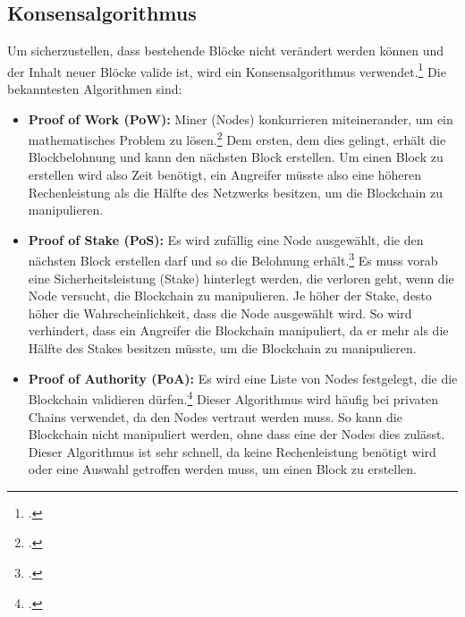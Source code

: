 \subsection{Konsensalgorithmus}
\label{sec:definition-konsensalgorithmus}
Um sicherzustellen, dass bestehende Blöcke nicht verändert werden können und der Inhalt neuer Blöcke valide ist, wird ein Konsensalgorithmus verwendet.\footcite[Vgl.][S. 2 f\adddot]{q4}
Die bekanntesten Algorithmen sind:
\begin{itemize}
    \item \textbf{Proof of Work (PoW):}
    Miner (Nodes) konkurrieren miteinerander, um ein mathematisches Problem zu lösen.\footcite[Vgl. hierzu und im Folgenden][3]{q4}
    Dem ersten, dem dies gelingt, erhält die Blockbelohnung und kann den nächsten Block erstellen.
    Um einen Block zu erstellen wird also Zeit benötigt, ein Angreifer müsste also eine höheren Rechenleistung als die Hälfte des Netzwerks besitzen, um die Blockchain zu manipulieren.

    \item \textbf{Proof of Stake (PoS):}
    Es wird zufällig eine Node ausgewählt, die den nächsten Block erstellen darf und so die Belohnung erhält.\footcite[Vgl. hierzu und im Folgenden][2]{q7}
    Es muss vorab eine Sicherheitsleistung (Stake) hinterlegt werden, die verloren geht, wenn die Node versucht, die Blockchain zu manipulieren. 
    Je höher der Stake, desto höher die Wahrscheinlichkeit, dass die Node ausgewählt wird.
    So wird verhindert, dass ein Angreifer die Blockchain manipuliert, da er mehr als die Hälfte des Stakes besitzen müsste, um die Blockchain zu manipulieren.

    \item \textbf{Proof of Authority (PoA):}
    Es wird eine Liste von Nodes festgelegt, die die Blockchain validieren dürfen.\footcite[Vgl. hierzu und im Folgenden][]{w14}
    Dieser Algorithmus wird häufig bei privaten Chains verwendet, da den Nodes vertraut werden muss.
    So kann die Blockchain nicht manipuliert werden, ohne dass eine der Nodes dies zulässt.
    Dieser Algorithmus ist sehr schnell, da keine Rechenleistung benötigt wird oder eine Auswahl getroffen werden muss, um einen Block zu erstellen.
    
\end{itemize}